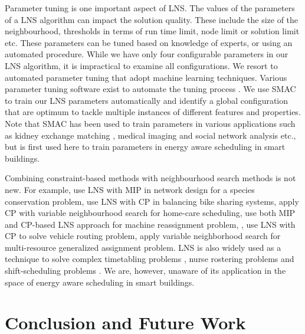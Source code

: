 Parameter tuning is one important aspect of LNS. The values of the parameters of a LNS algorithm can impact the solution quality. These include the size of the neighbourhood, thresholds in terms of run time limit, node limit or solution limit etc. These parameters can be tuned based on knowledge of experts, or using an automated procedure. While we have only four configurable parameters in our LNS algorithm, it is impractical to examine all configurations. We resort to automated parameter tuning that adopt machine learning techniques.  Various parameter tuning software exist to automate the tuning process \citep{thornton2013auto,bergstra2012random, hutter2011sequential}. We use SMAC \citep{hutter2011sequential} to train our LNS parameters automatically and identify a global configuration that are optimum to tackle multiple instances of different features and properties. 
Note that SMAC has been used to train parameters in various applications such as kidney exchange matching \citep{dickerson2015futurematch}, medical imaging \citep{angermueller2016deep} and social network analysis \citep{vaswani2016adaptive} etc., but is first used here to train parameters in energy aware scheduling in smart buildings.

Combining constraint-based methods with neighbourhood search methods is not new. For example, \cite{lebras2013robust} use LNS with MIP in network design for a species conservation problem, \cite{gaspero2013constraint} use LNS with CP in balancing bike sharing systems, \cite{rendl2012hybrid} apply CP with variable neighbourhood search for home-care scheduling, \cite{mehta2012comparing} use both MIP and CP-based LNS approach for machine reassignment problem, \cite{bent2004two}, \cite{kilby2011flexible} use LNS with CP to solve vehicle routing problem, \cite{mitrovicminic09local} apply variable neighborhood search for multi-resource generalized assignment problem. LNS is also widely used as a technique to solve complex timetabling problems \citep{meyers2006very,abdullah2007investigating,burke2010hybrid}, nurse rostering problems \citep{bilgin2012local} and shift-scheduling problems \citep{quimper2010large}. We are, however, unaware of its application in the space of energy aware scheduling in smart buildings.



\section{Conclusion and Future Work}\label{sec:lns:conclusion}

